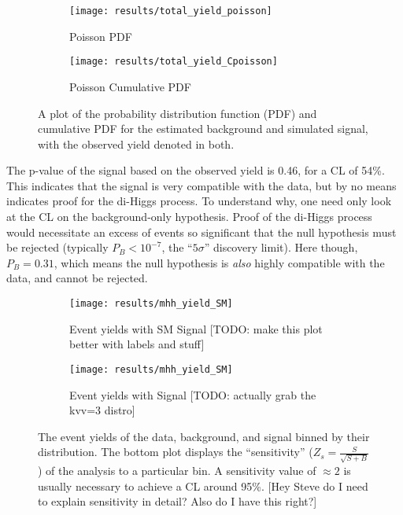     \begin{figure}
        \centering
        \begin{subfigure}{0.48\textwidth} 
            \texttt{[image: results/total\_yield\_poisson]}
            \caption{Poisson PDF}
            \label{fig:poisson_sig:pdf}
        \end{subfigure}
        \begin{subfigure}{0.48\textwidth}
            \texttt{[image: results/total\_yield\_Cpoisson]}
            \caption{Poisson Cumulative PDF}
            \label{fig:poisson_sig:Cpdf}
        \end{subfigure}
        \caption{
            A plot of the probability distribution function (PDF)
                and cumulative PDF for the estimated background and simulated signal,
                with the observed yield denoted in both.
        }
    \end{figure}

    The p-value of the signal based on the observed yield is 0.46,
        for a CL of 54\%.
    This indicates that the signal is very compatible with the data,
        but by no means indicates proof for the di-Higgs process.
    To understand why, one need only look at the CL on the background-only hypothesis.
    Proof of the di-Higgs process would necessitate an excess of events so significant that
        the null hypothesis must be rejected (typically $P_B < 10^{-7}$, the ``$5\sigma$'' discovery limit).
    Here though, $P_B = 0.31$, which means the null hypothesis is \textit{also} highly compatible with the data,
        and cannot be rejected.

    \begin{figure}
        \centering
        \begin{subfigure}{0.48\textwidth} 
            \texttt{[image: results/mhh\_yield\_SM]}
            \caption{Event yields with SM Signal [TODO: make this plot better with labels and stuff]}
            \label{fig:mhh_yield:kvv1}
        \end{subfigure}
        \begin{subfigure}{0.48\textwidth}
            \texttt{[image: results/mhh\_yield\_SM]}
            \caption{Event yields with Signal  [TODO: actually grab the kvv=3 distro]}
            \label{fig:mhh_yield:kvv3}
        \end{subfigure}
        \caption{
            The event yields of the data, background, and signal binned by their \mhh distribution.
            The bottom plot displays the ``sensitivity'' ($Z_s=\frac{S}{\sqrt{S+B}}$)
                of the analysis to a particular \mhh bin.
            A sensitivity value of $\approx 2$ is usually necessary to achieve a CL around 95\%.
            [Hey Steve do I need to explain sensitivity in detail? Also do I have this right?]
        }
    \end{figure}


